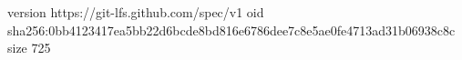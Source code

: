 version https://git-lfs.github.com/spec/v1
oid sha256:0bb4123417ea5bb22d6bcde8bd816e6786dee7c8e5ae0fe4713ad31b06938c8c
size 725
